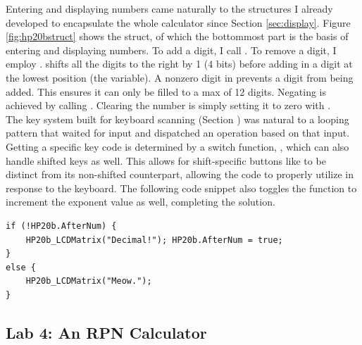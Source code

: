\documentclass{LibHP20b}
\begin{document}
Entering and displaying numbers came naturally to the structures I already developed to encapsulate the whole calculator since Section \ref{sec:display}. Figure \ref{fig:hp20bstruct} shows the  struct, of which the bottommost part is the basis of entering and displaying numbers. To add a digit, I call . To remove a digit, I employ .  shifts all the digits to the right by 1  (4 bits) before adding in a digit at the lowest position (the  variable). A nonzero digit in  prevents a digit from being added. This ensures it can only be filled to a max of 12 digits. Negating  is achieved by calling . Clearing the number is simply setting it to zero with .\\
The key system built for keyboard scanning (Section ) was natural to a looping pattern that waited for input and dispatched an operation based on that input. Getting a specific key code is determined by a switch function, , which can also handle shifted keys as well. This allows for shift-specific buttons like \CWord{+/-} to be distinct from its non-shifted counterpart, allowing the code to properly utilize  in response to the keyboard. The following code snippet also toggles the  function to increment the exponent value as well, completing the solution.
\begin{lstlisting}
if (!HP20b.AfterNum) {
	HP20b_LCDMatrix("Decimal!"); HP20b.AfterNum = true;
}
else {
	HP20b_LCDMatrix("Meow.");
}
\end{lstlisting}

\subsection{Lab 4: An RPN Calculator}
\end{document}
